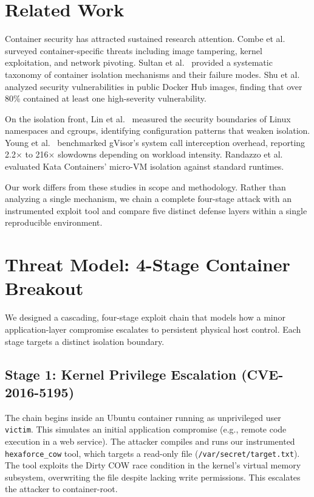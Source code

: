 \documentclass[conference]{IEEEtran}
\begin{document}
\section{Related Work}
Container security has attracted sustained research attention. Combe et al.~\cite{b8} surveyed container-specific threats including image tampering, kernel exploitation, and network pivoting. Sultan et al.~\cite{b10} provided a systematic taxonomy of container isolation mechanisms and their failure modes. Shu et al.~\cite{b11} analyzed security vulnerabilities in public Docker Hub images, finding that over 80\% contained at least one high-severity vulnerability.

On the isolation front, Lin et al.~\cite{b12} measured the security boundaries of Linux namespaces and cgroups, identifying configuration patterns that weaken isolation. Young et al.~\cite{b13} benchmarked gVisor's system call interception overhead, reporting 2.2$\times$ to 216$\times$ slowdowns depending on workload intensity. Randazzo et al.~\cite{b14} evaluated Kata Containers' micro-VM isolation against standard runtimes.

Our work differs from these studies in scope and methodology. Rather than analyzing a single mechanism, we chain a complete four-stage attack with an instrumented exploit tool and compare five distinct defense layers within a single reproducible environment.

\section{Threat Model: 4-Stage Container Breakout}
We designed a cascading, four-stage exploit chain that models how a minor application-layer compromise escalates to persistent physical host control. Each stage targets a distinct isolation boundary.

\subsection{Stage 1: Kernel Privilege Escalation (CVE-2016-5195)}
The chain begins inside an Ubuntu container running as unprivileged user \texttt{victim}. This simulates an initial application compromise (e.g., remote code execution in a web service). The attacker compiles and runs our instrumented \texttt{hexaforce\_cow} tool, which targets a read-only file (\texttt{/var/secret/target.txt}). The tool exploits the Dirty COW race condition in the kernel's virtual memory subsystem, overwriting the file despite lacking write permissions. This escalates the attacker to container-root.
\end{document}
